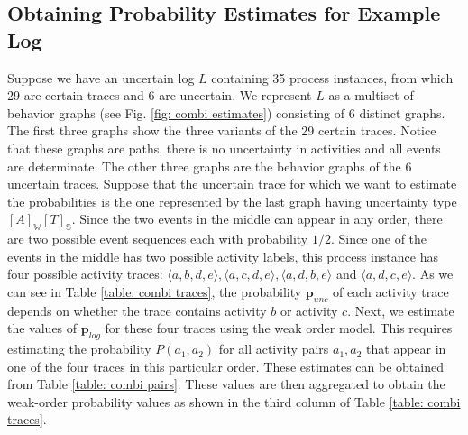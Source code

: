 \subsection{Obtaining Probability Estimates for Example Log}
Suppose we have an uncertain log $L$ containing 35 process instances, from which 29 are certain traces and 6 are uncertain.
We represent $L$ as a multiset of behavior graphs \cite{space} (see Fig. \ref{fig: combi estimates}) consisting of 6 distinct graphs.
The first three graphs show the three variants of the 29 certain traces.
Notice that these graphs are paths, there is no uncertainty in activities and all events are determinate.
The other three graphs are the behavior graphs of the 6 uncertain traces.
Suppose that the uncertain trace for which we want to estimate the probabilities is the one represented by the last graph having uncertainty type $[A]_{\mathbb{W}}[T]_{\mathbb{S}}$.
Since the two events in the middle can appear in any order, there are two possible event sequences each with probability $1/2$.
Since one of the events in the middle has two possible activity labels, this process instance has four possible activity traces:
$\langle a,b,d,e\rangle, \langle a,c,d,e\rangle, \langle a,d,b,e\rangle$ and $\langle a,d,c,e\rangle$.
As we can see in Table \ref{table: combi traces}, the probability $\textbf{p}_{unc}$ of each activity trace depends on whether the trace contains activity $b$ or activity $c$.
Next, we estimate the values of $\textbf{p}_{log}$ for these four traces using the weak order model.
This requires estimating the probability $P(a_1,a_2)$ for all activity pairs $a_1,a_2$ that appear in one of the four traces in this particular order.
These estimates can be obtained from Table \ref{table: combi pairs}.
These values are then aggregated to obtain the weak-order probability values as shown in the third column of Table \ref{table: combi traces}.
%
%
%
%
%
